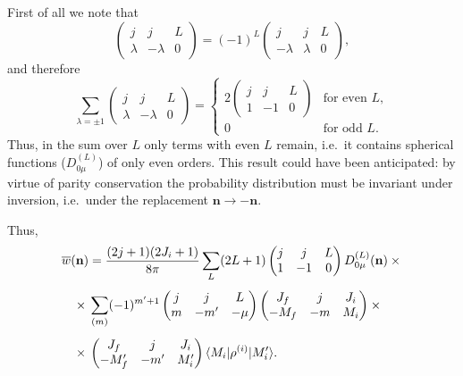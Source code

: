 First of all we note that
\begin{equation}
\begin{pmatrix} j & j & L \\ \lambda & -\lambda & 0\end{pmatrix} = (-1)^L\begin{pmatrix} j & j & L \\ -\lambda & \lambda & 0\end{pmatrix},
\tag{48.8}
\end{equation}
and therefore
\[
\sum_{\lambda = \pm 1}\begin{pmatrix} j & j & L \\ \lambda & -\lambda & 0\end{pmatrix} = \begin{cases} 2\begin{pmatrix} j & j & L \\ 1 & -1 & 0\end{pmatrix} & \text{for even } L,\\[6pt] 0 & \text{for odd } L.\end{cases}
\]
Thus, in the sum over $L$ only terms with even $L$ remain, i.e.\ it contains spherical functions ($D^{(L)}_{0\mu}$) of only even orders. This result could have been anticipated: by virtue of parity conservation the probability distribution must be invariant under inversion, i.e.\ under the replacement $\mathbf{n} \to -\mathbf{n}$.

Thus,
\begin{align}
\overline{w}(\mathbf{n}) &= \frac{(2j+1)(2J_i+1)}{8\pi}\sum_L(2L+1)\begin{pmatrix} j & j & L \\ 1 & -1 & 0\end{pmatrix}D^{(L)}_{0\mu}(\mathbf{n})\times{}\notag\\[4pt]
{}\times{}&\sum_{(m)}(-1)^{m'+1}\begin{pmatrix} j & j & L \\ m & -m' & -\mu\end{pmatrix}\begin{pmatrix} J_f & j & J_i \\ -M_f & -m & M_i\end{pmatrix}\times{}\notag\\[4pt]
{}\times{}&\begin{pmatrix} J_f & j & J_i \\ -M'_f & -m' & M'_i\end{pmatrix}\langle M_i|\rho^{(i)}|M'_i\rangle.
\end{align}

